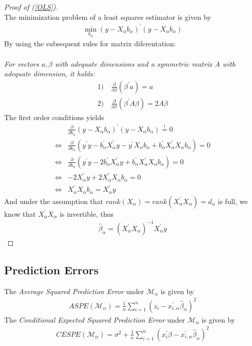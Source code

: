 \documentclass[Research_Module_ES.tex]{subfiles}
\begin{document}
\begin{proof}[Proof of (\ref{OLS})]~\\
	The minimization problem of a least squares estimator is given by
	\begin{align*}
	\min_{b_\alpha}(y-X_\alpha b_\alpha)^\prime(y-X_\alpha b_\alpha)
	\end{align*}
	By using the subsequent rules for matrix diferentation:\\\\
	\textit{For vectors $a,\beta$ with adequate dimensions and a symmetric matrix A with adequate dimension, it holds:}
	\begin{align*}
	1)&~ \frac{\partial}{\partial \beta}(\beta^\prime a)=a\\
	2)&~\frac{\partial}{\partial \beta}(\beta^\prime A\beta)=2A\beta
	\end{align*}
	The first order conditions yields
	\begin{align*}
		& \frac{\partial}{\partial b_\alpha}(y-X_\alpha b_\alpha)^\prime(y-X_\alpha b_\alpha)\stackrel{!}{=}0\\
	\Leftrightarrow & \frac{\partial}{\partial b_\alpha}(y^\prime y-b_\alpha^\prime X_\alpha^\prime y-y^\prime X_\alpha b_\alpha+b_\alpha^\prime X_\alpha^\prime X_\alpha b_\alpha)=0\\
	\Leftrightarrow & \frac{\partial}{\partial b_\alpha}(y^\prime y-2b_\alpha^\prime X_\alpha^\prime y+b_\alpha^\prime X_\alpha^\prime X_\alpha b_\alpha)=0\\
	\Leftrightarrow & -2X_\alpha^\prime y +2 X_\alpha^\prime X_\alpha b_\alpha=0\\
	\Leftrightarrow & X_\alpha^\prime X_\alpha b_\alpha=X_\alpha^\prime y
	\end{align*}
	And under the assumption that $rank(X_\alpha)=rank(X_\alpha^\prime X_\alpha)=d_\alpha$ is full, we know that $X_\alpha^\prime X_\alpha$ is invertible, thus 
	\begin{align*}
		 \hat{\beta}_\alpha=(X_\alpha^\prime X_\alpha)^{-1}X_\alpha^\prime y
	\end{align*}
\end{proof}



\subsection{Prediction Errors}
The \textit{Average Squared Prediction Error} under $\mathcal{M}_\alpha$ is given by
\begin{align}
ASPE(\mathcal{M}_\alpha)=\frac{1}{n}\sum_{i=1}^{n}(z_i-x_{i,\alpha}^\prime\hat{\beta}_\alpha)^2 \label{ASPE}
\end{align}
The \textit{Conditional Expected Squared Prediction Error} under $\mathcal{M}_\alpha$ is given by
\begin{align*}
CESPE(\mathcal{M}_\alpha)=\sigma^2+\frac{1}{n}\sum_{i=1}^{n}(x_i^\prime\beta-x_{i,\alpha}^\prime\hat{\beta}_\alpha)^2
\end{align*}
\end{document}
